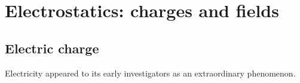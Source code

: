 \chapter{Electrostatics: charges and fields}

\section{Electric charge}

Electricity appeared to its early investigators as an extraordinary phenomenon.
